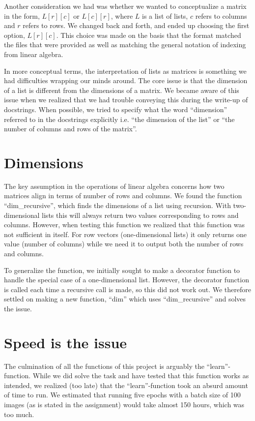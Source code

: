\documentclass[letterpaper, 12 pt, conference]{ieeeconf}
\begin{document}
Another consideration we had was whether we wanted to conceptualize a matrix in the form, $L[r][c]$ or $L[c][r]$, where $L$ is a list of lists, $c$ refers to columns and $r$ refers to rows. We changed back and forth, and ended up choosing the first option, $L[r][c]$. This choice was made on the basis that the format matched the files that were provided as well as matching the general notation of indexing from linear algebra.

In more conceptual terms, the interpretation of lists as matrices is something we had difficulties wrapping our minds around. The core issue is that the dimension of a list is different from the dimensions of a matrix. We became aware of this issue when we realized that we had trouble conveying this during the write-up of docstrings. When possible, we tried to specify what the word “dimension” referred to in the docstrings explicitly i.e. “the dimension of the list” or “the number of columns and rows of the matrix”.

\section{Dimensions}

The key assumption in the operations of linear algebra concerns how two matrices align in terms of number of rows and columns. We found the function “dim\_recursive”, which finds the dimensions of a list using recursion. With two-dimensional lists this will always return two values corresponding to rows and columns. However, when testing this function we realized that this function was not sufficient in itself. For row vectors (one-dimensional lists) it only returns one value (number of columns) while we need it to output both the number of rows and columns.  

To generalize the function, we initially sought to make a decorator function to handle the special case of a one-dimensional list. However, the decorator function is called each time a recursive call is made, so this did not work out. We therefore settled on making a new function, “dim” which uses “dim\_recursive” and solves the issue.

\section{Speed is the issue}

The culmination of all the functions of this project is arguably the “learn”-function. While we did solve the task and have tested that this function works as intended, we realized (too late) that the “learn”-function took an absurd amount of time to run. We estimated that running five epochs with a batch size of 100 images (as is stated in the assignment) would take almost 150 hours, which was too much. 
\end{document}
